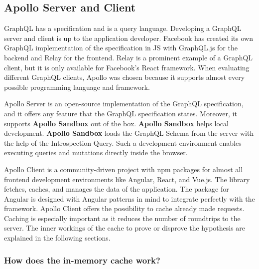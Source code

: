 \subsection{Apollo Server and Client}\label{subsection:background:graphql:apollo-server-client}

GraphQL has a specification and is a query language. Developing a GraphQL server and client is up to the application developer. Facebook has created its own GraphQL implementation of the specification in \ac{JS} with GraphQL.js for the backend and Relay for the frontend. Relay is a prominent example of a GraphQL client, but it is only available for Facebook's React framework. When evaluating different GraphQL clients, Apollo was chosen because it supports almost every possible programming language and framework.

\bigskip

\noindent Apollo Server is an open-source implementation of the GraphQL specification, and it offers any feature that the GraphQL specification states. Moreover, it supports \textbf{Apollo Sandbox} out of the box. \cite{misc:-:background:graphql:apollo-server-introduction} \textbf{Apollo Sandbox} helps local development. \textbf{Apollo Sandbox} loads the GraphQL Schema from the server with the help of the Introspection Query. \cite{misc:-:background:graphql:apollo-sandbox} Such a development environment enables executing queries and mutations directly inside the browser.

\bigskip

\noindent Apollo Client is a community-driven project with npm packages for almost all frontend development environments like Angular, React, and Vue.js. The library fetches, caches, and manages the data of the application. The package for Angular is designed with Angular patterns in mind to integrate perfectly with the framework. Apollo Client offers the possibility to cache already made requests. \cite{misc:-:background:graphql:apollo-angular-client-overview} \cite{misc:-:background:graphql:apollo-client-overview} Caching is especially important as it reduces the number of roundtrips to the server. The inner workings of the cache to prove or disprove the hypothesis are explained in the following sections.

\subsubsection{How does the in-memory cache work?}\label{subsubsection:background:graphql:apollo-server-client:in-memory-cache-working}

